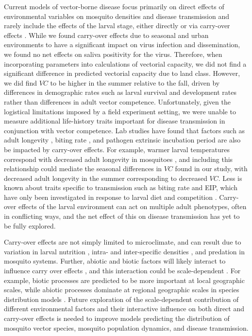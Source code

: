 \documentclass[12pt]{article}
\begin{document}
Current models of vector-borne disease focus primarily on direct effects of environmental variables on mosquito densities and disease transmission and rarely include the effects of the larval stage, either directly or via carry-over effects \cite{reiner2013}.
While we found carry-over effects due to seasonal and urban environments to have a significant impact on virus infection and dissemination, we found no net effects on saliva positivity for the virus.
Therefore, when incorporating parameters into calculations of vectorial capacity, we did not find a significant difference in predicted vectorial capacity due to land class.
However, we did find $VC$ to be higher in the summer relative to the fall, driven by differences in demographic rates such as larval survival and development rates rather than differences in adult vector competence.
Unfortunately, given the logistical limitations imposed by a field experiment setting, we were unable to measure additional life-history traits important for disease transmission in conjunction with vector competence.
Lab studies have found that factors such as adult longevity \cite{christiansen-jucht2014}, biting rate \cite{moller-jacobs2014}, and pathogen extrinsic incubation period \cite{shapiro2016, bara2015} are also be impacted by carry-over effects.
For example, warmer larval temperatures correspond with decreased adult longevity in mosquitoes \cite{christiansen-jucht2014}, and including this relationship could mediate the seasonal differences in $VC$ found in our study, with decreased adult longevity in the summer corresponding to decreased $VC$.
Less is known about traits specific to transmission such as biting rate and EIP, which have only been investigated in response to larval diet and competition \cite{moller-jacobs2014,shapiro2016, bara2015}.
Carry-over effects of the larval environment can act on multiple adult phenotypes, often in conflicting ways, and the net effect of this on disease transmission has yet to be fully explored.

Carry-over effects are not simply limited to microclimate, and can result due to variation in larval nutrition \cite{moller-jacobs2014}, intra- and inter-specific densities \cite{alto2005}, and predation \cite{roux2015a} in mosquito systems.
Further, abiotic and biotic factors will likely interact to influence carry over effects \cite{buckner2016, muturi2012a}, and this interaction could be scale-dependent \cite{leisnham2014}.
For example, biotic processes are predicted to be more important at local geographic scales, while abiotic processes dominate at regional geographic scales in species distribution models \cite{cohen2016}.
Future exploration of the scale-dependent contribution of different environmental factors and their interactive influence on both direct and carry-over effects is needed to improve models predicting the distribution of mosquito vector species, mosquito population dynamics, and disease transmission.
\end{document}
